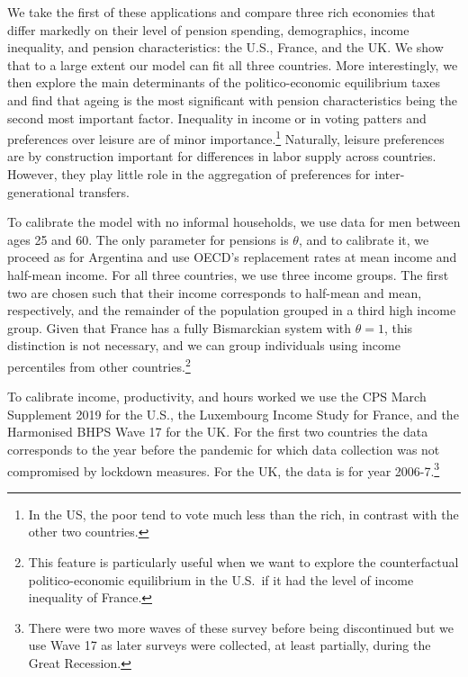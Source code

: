 We take the first of these applications and compare three rich economies that differ markedly on their level of pension spending, demographics, income inequality, and pension characteristics: the U.S., France, and the UK. We show that to a large extent our model can fit all three countries. More interestingly, we then explore the main determinants of the politico-economic equilibrium taxes and find that ageing is the most significant with pension characteristics being the second most important factor. Inequality in income or in voting patters and preferences over leisure are of minor importance.\footnote{In the US, the poor tend to vote much less than the rich, in contrast with the other two countries.} Naturally, leisure preferences are by construction important for differences in labor supply across countries. However, they play little role in the aggregation of preferences for inter-generational transfers. 


To calibrate the model with no informal households, we use data for men between ages 25 and 60. The only parameter for pensions is $\theta$, and to calibrate it, we proceed as for Argentina and use OECD's replacement rates at mean income and half-mean income. For all three countries, we use three income groups. The first two are chosen such that their income corresponds to half-mean and mean, respectively, and the remainder of the population grouped in a third high income group. Given that France has a fully Bismarckian system with $\theta=1$, this distinction is not necessary, and we can group individuals using income percentiles from other countries.\footnote{This feature is particularly useful when we want to explore the counterfactual politico-economic equilibrium in the U.S.\ if it had the level of income inequality of France.} 

To calibrate income, productivity, and hours worked we use the CPS March Supplement 2019 for the U.S., the Luxembourg Income Study for France, and the Harmonised BHPS Wave 17 for the UK. For the first two countries the data corresponds to the year before the pandemic for which data collection was not compromised by lockdown measures. For the UK, the data is for year 2006-7.\footnote{There were two more waves of these survey before being discontinued but we use Wave 17 as later surveys were collected, at least partially, during the Great Recession.} 


